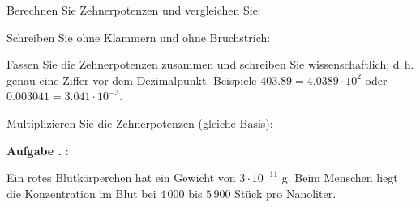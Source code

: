 \newcommand\aufgabeMLo[3]{

\textbf{Aufgabe \arabic{bbwAufgabenNummerCounter}.} :\,\,
$${#2}  \TRAINER{{#3}}$$

\abplz{#1}

\stepcounter{bbwAufgabenNummerCounter}
}%




Berechnen Sie Zehnerpotenzen und vergleichen Sie:


\noTRAINER{\newpage}





Schreiben Sie ohne Klammern und ohne Bruchstrich:

Fassen Sie die Zehnerpotenzen zusammen und schreiben Sie
wissenschaftlich; d.\,h. genau eine Ziffer vor dem
Dezimalpunkt. Beispiele $403.89 = 4.0389\cdot{} 10^2$ oder $0.003041 =
3.041\cdot{} 10^{-3}$.



Multiplizieren Sie die Zehnerpotenzen (gleiche Basis):

\TRAINER{\newpage}
\textbf{Aufgabe .} :

Ein rotes Blutkörperchen hat ein Gewicht von $3\cdot{}10^{-11}$ g.
Beim Menschen liegt die Konzentration im Blut bei $4\,000$ bis $5\,900$ Stück pro Nanoliter.


